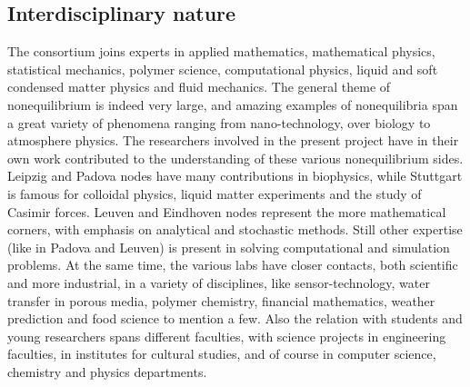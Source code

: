 \subsection{Interdisciplinary nature}\label{sec:interdisc}


The consortium joins experts in applied mathematics, mathematical physics, statistical mechanics, polymer science, computational physics, liquid and soft condensed matter physics and fluid mechanics.
The general theme of nonequilibrium is indeed very  large, and amazing examples of nonequilibria span a great variety of phenomena ranging from nano-technology, over biology to atmosphere physics.
The researchers involved in the present project have in their own work contributed to the understanding of these various nonequilibrium sides.  Leipzig and Padova nodes have many contributions in biophysics, while Stuttgart is famous for colloidal physics, liquid matter experiments and the study of Casimir forces.  Leuven and Eindhoven nodes represent the more mathematical corners, with emphasis on analytical and stochastic methods.  Still other expertise (like in Padova and Leuven) is present in solving computational and simulation problems.   At the same time, the various labs have closer contacts, both scientific and more industrial, in a variety of disciplines, like sensor-technology, water transfer in porous media, polymer chemistry, financial mathematics, weather prediction and food science to mention a few.  Also the relation with students and young researchers spans different faculties, with science projects in engineering faculties, in institutes for cultural studies, and of course in computer science, chemistry and physics departments.



